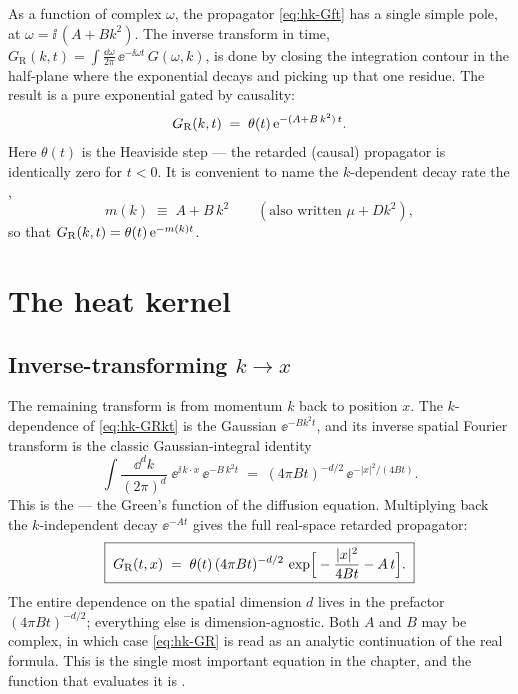 As a function of complex $\omega$, the propagator \eqref{eq:hk-Gft} has a single
simple pole, at $\omega = \ii\,(A + Bk^{2})$. The inverse transform in time,
$G_{\mathrm R}(k,t) = \int \frac{\dd\omega}{2\pi}\,\ee^{-\ii\omega t}\,G(\omega,k)$,
is done by closing the integration contour in the half-plane where the
exponential decays and picking up that one residue. The result is a pure
exponential gated by causality:
\begin{equation}
  G_{\mathrm R}(k,t) \;=\; \theta(t)\,\mathrm{e}^{-(A + B\,k^{2})\,t}.
  \label{eq:hk-GRkt}
\end{equation}
Here $\theta(t)$ is the Heaviside step --- the retarded (causal) propagator is
identically zero for $t<0$. It is convenient to name the $k$-dependent decay
rate the ,
\[
  m(k) \;\equiv\; A + B\,k^{2} \qquad(\text{also written } \mu + D k^{2}),
\]
so that $G_{\mathrm R}(k,t)=\theta(t)\,\mathrm{e}^{-m(k)t}$.

\section{The heat kernel}\label{sec:hk-kernel}

\subsection{Inverse-transforming $k\to x$}

The remaining transform is from momentum $k$ back to position $x$. The
$k$-dependence of \eqref{eq:hk-GRkt} is the Gaussian $\ee^{-Bk^{2}t}$, and its
inverse spatial Fourier transform is the classic Gaussian-integral identity
\begin{equation}
  \int \frac{\dd^{d}k}{(2\pi)^{d}}\;\ee^{\ii\,k\cdot x}\,\ee^{-B\,k^{2}t}
  \;=\;
  (4\pi B t)^{-d/2}\,\ee^{-|x|^{2}/(4Bt)}.
  \label{eq:hk-gaussianFT}
\end{equation}
This is the  --- the Green's function of the diffusion
equation. Multiplying back the $k$-independent decay $\ee^{-At}$ gives the full
real-space retarded propagator:
\begin{equation}
  \boxed{\;
  G_{\mathrm R}(t,x) \;=\; \theta(t)\,(4\pi B t)^{-d/2}\,
  \exp\!\Big[-\frac{|x|^{2}}{4 B t} - A\,t\Big].
  \;}
  \label{eq:hk-GR}
\end{equation}
The entire dependence on the spatial dimension $d$ lives in the prefactor
$(4\pi B t)^{-d/2}$; everything else is dimension-agnostic. Both $A$ and $B$ may
be complex, in which case \eqref{eq:hk-GR} is read as an analytic continuation
of the real formula. This is the single most important equation in the chapter,
and the function that evaluates it is .

